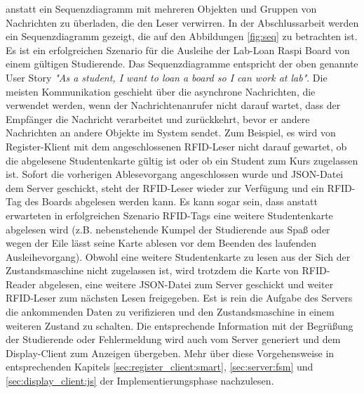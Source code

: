 anstatt ein Sequenzdiagramm mit mehreren Objekten und Gruppen von Nachrichten zu überladen, die den Leser verwirren. In der Abschlussarbeit werden ein Sequenzdiagramm gezeigt, die auf den Abbildungen \ref{fig:seq} zu betrachten ist. Es ist ein erfolgreichen Szenario für die Ausleihe der Lab-Loan Raspi Board von einem gültigen Studierende. Das Sequenzdiagramme entspricht der oben genannte User Story \textit{"As a student, I want to loan a board so I can work at lab"}. Die meisten Kommunikation geschieht über die asynchrone Nachrichten, die verwendet werden, wenn der Nachrichtenanrufer nicht darauf wartet, dass der Empfänger die Nachricht verarbeitet und zurückkehrt, bevor er andere Nachrichten an andere Objekte im System sendet. Zum Beispiel, es wird von Register-Klient mit dem angeschlossenen RFID-Leser nicht darauf gewartet, ob die abgelesene Studentenkarte gültig ist oder ob ein Student zum Kurs zugelassen ist. Sofort die vorherigen Ablesevorgang angeschlossen wurde und JSON-Datei dem Server geschickt, steht der RFID-Leser wieder zur Verfügung und ein RFID-Tag des Boards abgelesen werden kann. Es kann sogar sein, dass anstatt erwarteten in erfolgreichen Szenario RFID-Tags eine weitere Studentenkarte abgelesen wird (z.B. nebenstehende Kumpel der Studierende aus Spaß oder wegen der Eile lässt seine Karte ablesen vor dem Beenden des laufenden Ausleihevorgang). Obwohl eine weitere Studentenkarte zu lesen aus der Sich der Zustandsmaschine nicht zugelassen ist, wird trotzdem die Karte von RFID-Reader abgelesen, eine weitere JSON-Datei zum Server geschickt und weiter RFID-Leser zum nächsten Lesen freigegeben. Est is rein die Aufgabe des Servers die ankommenden Daten zu verifizieren und den Zustandsmaschine in einem weiteren Zustand zu schalten. Die entsprechende Information mit der Begrüßung der Studierende oder Fehlermeldung wird auch vom Server generiert und dem Display-Client zum Anzeigen übergeben. Mehr über diese Vorgehensweise in entsprechenden Kapitels \ref{sec:register_client:smart}, \ref{sec:server:fsm} und \ref*{sec:display_client:js} der Implementierungsphase nachzulesen. 


